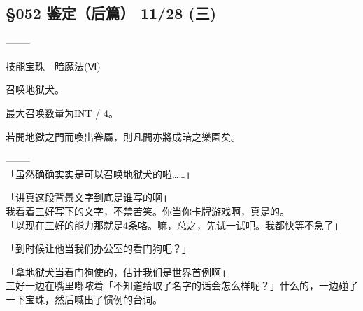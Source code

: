\subsection{§052 鉴定（后篇） 11/28 (三)}

  --------

  技能宝珠　暗魔法(Ⅵ)

%  


  召唤地狱犬。

  最大召唤数量为INT / 4。

%  


  若開地獄之門而喚出眷屬，則凡間亦將成暗之樂園矣。

  --------\\

「虽然确确实实是可以召唤地狱犬的啦……」

「讲真这段背景文字到底是谁写的啊」\\

我看着三好写下的文字，不禁苦笑。你当你卡牌游戏啊，真是的。\\

「以现在三好的能力那就是4条咯。嘛，总之，先试一试吧。我都快等不急了」

「到时候让他当我们办公室的看门狗吧？」

「拿地狱犬当看门狗使的，估计我们是世界首例啊」\\

三好一边在嘴里嘟哝着「不知道给取了名字的话会怎么样呢？」什么的，一边碰了一下宝珠，然后喊出了惯例的台词。\\

